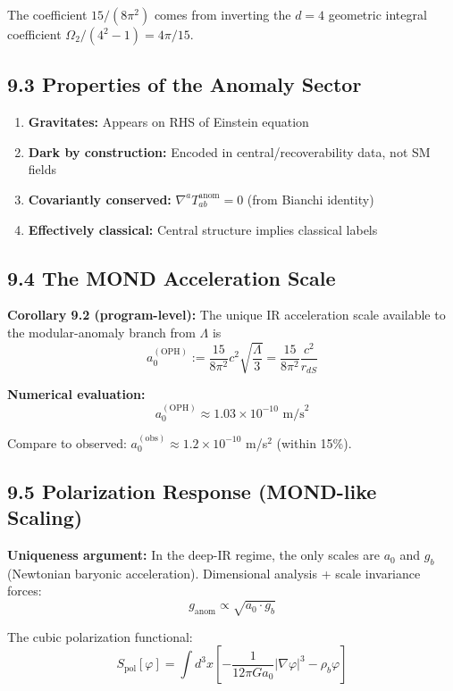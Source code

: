 The coefficient \(15/(8\pi^2)\) comes from inverting the \(d=4\) geometric integral coefficient \(\Omega_2/(4^2-1) = 4\pi/15\).

\subsection{9.3 Properties of the Anomaly Sector}\label{93-properties-of-the-anomaly-sector}

\begin{enumerate}
\def\labelenumi{\arabic{enumi}.}
\tightlist
\item
  \textbf{Gravitates:} Appears on RHS of Einstein equation
\item
  \textbf{Dark by construction:} Encoded in central/recoverability data, not SM fields
\item
  \textbf{Covariantly conserved:} \(\nabla^a T_{ab}^{\text{anom}} = 0\) (from Bianchi identity)
\item
  \textbf{Effectively classical:} Central structure implies classical labels
\end{enumerate}

\subsection{9.4 The MOND Acceleration Scale}\label{94-the-mond-acceleration-scale}

\textbf{Corollary 9.2 (program-level):} The unique IR acceleration scale available to the modular-anomaly branch from \(\Lambda\) is \[a_0^{(\text{OPH})} := \frac{15}{8\pi^2} c^2 \sqrt{\frac{\Lambda}{3}} = \frac{15}{8\pi^2} \frac{c^2}{r_{dS}}\]

\textbf{Numerical evaluation:} \[a_0^{(\text{OPH})} \approx 1.03 \times 10^{-10} \text{ m/s}^2\]

Compare to observed: \(a_0^{(\text{obs})} \approx 1.2 \times 10^{-10}\) m/s\(^2\) (within 15\%).

\subsection{9.5 Polarization Response (MOND-like Scaling)}\label{95-polarization-response-mond-like-scaling}

\textbf{Uniqueness argument:} In the deep-IR regime, the only scales are \(a_0\) and \(g_b\) (Newtonian baryonic acceleration). Dimensional analysis + scale invariance forces: \[g_{\text{anom}} \propto \sqrt{a_0 \cdot g_b}\]

The cubic polarization functional: \[S_{\text{pol}}[\varphi] = \int d^3x \left[-\frac{1}{12\pi G a_0}|\nabla\varphi|^3 - \rho_b \varphi\right]\]

